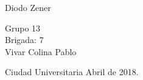 \begin{titlepage}
\begin{center}
        
         

\Large Diodo Zener
        
          \begin{flushright}
\footnotesize  Grupo 13\\[0.5cm]
\footnotesize Brigada: 7\\[0.5cm]

\footnotesize Vivar Colina Pablo\\[0.5cm]
 \end{flushright}
          \begin{flushleft}
        \footnotesize Ciudad Universitaria Abril de 2018.\\
          \end{flushleft}
         
          
   \end{center}
\end{titlepage}
